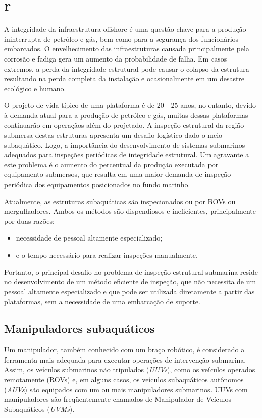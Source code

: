 \chapter{r}
A integridade da infraestrutura offshore é uma questão-chave para a produção ininterrupta de petróleo e gás, bem como para a segurança dos funcionários embarcados. O envelhecimento das infraestruturas causada principalmente pela corrosão e fadiga gera um aumento da probabilidade de falha. Em casos extremos, a perda da integridade estrutural pode causar o colapso da estrutura resultando na perda completa da instalação e ocasionalmente em um desastre ecológico e humano.

O projeto de vida típico de uma plataforma é de 20 - 25 anos, no entanto, devido à demanda atual para a produção de petróleo e gás, muitas dessas plataformas continuarão em operaçãos além do projetado. A inspeção estrutural da região submersa destas estruturas apresenta um desafio logístico dado o meio subaquático. Logo, a importância do desenvolvimento de sistemas submarinos adequados para inspeções periódicas de integridade estrutural. Um agravante a este problema é o aumento do percentual da produção executada por equipamento submersos, que resulta em uma maior demanda de inspeção periódica dos equipamentos posicionados no fundo marinho.

Atualmente, as estruturas subaquáticas são inspecionados ou por ROVs ou mergulhadores. Ambos os métodos são dispendiosos e ineficientes, principalmente por duas razões:

\begin{itemize}
	\item necessidade de pessoal altamente especializado;
	\item e o tempo necessário para realizar inspeções manualmente.
\end{itemize}

Portanto, o principal desafio no problema de inspeção estrutural submarina reside no desenvolvimento de um método eficiente de inspeção, que não necessita de um pessoal altamente especializado e que pode ser utilizada diretamente a partir das plataformas, sem a necessidade de uma embarcação de suporte.

\section{Manipuladores subaquáticos}
\label{chap:sotamani}
Um manipulador, também conhecido com um braço robótico, é considerado a ferramenta mais adequada para executar operações de intervenção submarina. Assim, os veículos submarinos não tripulados (\textit{\acs{UUV}s}), como os veículos operados remotamente (ROVs) e, em alguns casos, os veículos subaquáticos autônomos (\textit{\acs{AUV}s}) são equipados com um ou mais manipuladores submarinos. UUVs com manipuladores são freqüentemente chamados de Manipulador de Veículos Subaquáticos (\textit{\acs{UVM}s}).

